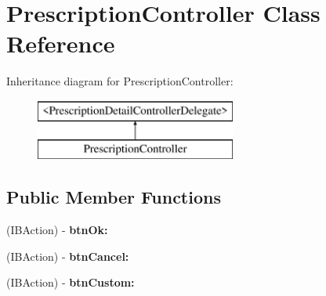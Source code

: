 \hypertarget{interface_prescription_controller}{
\section{PrescriptionController Class Reference}
\label{interface_prescription_controller}
}
Inheritance diagram for PrescriptionController:\begin{figure}[H]
\begin{center}
\leavevmode
\includegraphics[height=2.000000cm]{interface_prescription_controller}
\end{center}
\end{figure}
\subsection*{Public Member Functions}
\begin{DoxyCompactItemize}
\item 
\hypertarget{interface_prescription_controller_a277a6ef0531e3fee51be598dd445d1cf}{
(IBAction) -\/ {\bfseries btnOk:}}
\label{interface_prescription_controller_a277a6ef0531e3fee51be598dd445d1cf}

\item 
\hypertarget{interface_prescription_controller_a8d37c33a9465b64250e6c576ff8c5118}{
(IBAction) -\/ {\bfseries btnCancel:}}
\label{interface_prescription_controller_a8d37c33a9465b64250e6c576ff8c5118}

\item 
\hypertarget{interface_prescription_controller_a81148d3769214ed1ae11605e083ef30a}{
(IBAction) -\/ {\bfseries btnCustom:}}
\label{interface_prescription_controller_a81148d3769214ed1ae11605e083ef30a}

\end{DoxyCompactItemize}
